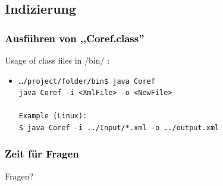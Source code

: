 \documentclass[xcolor=dvipsnames]{beamer}
\begin{document}
\subsection{Indizierung}


\begin{frame}[fragile]\frametitle{\textcolor{black}{Ausführen von ,,Coref.class''}}

\begin{block}{Usage of class files in /bin/ :}
\begin{itemize}
\item 
\begin{scriptsize}\begin{verbatim}
…/project/folder/bin$ java Coref
java Coref -i <XmlFile> -o <NewFile>

Example (Linux):
$ java Coref -i ../Input/*.xml -o ../output.xml
\end{verbatim}
\end{scriptsize}
\end{itemize}
\end{block}
\end{frame}

\addtocounter{framenumber}{-3}


\begin{frame}[plain]
\frametitle{\textcolor{black}{Zeit für Fragen}}
\begin{center}
  Fragen?
\end{center}
\end{frame}


\end{document}
